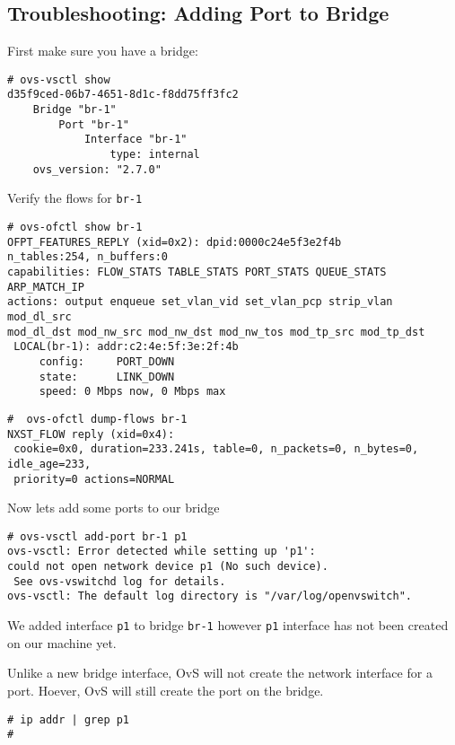 \documentclass[letter]{article}
\begin{document}
{{\begin{appendices}
{\subsection{Troubleshooting: Adding Port to Bridge}

First make sure you have a bridge:
\begin{lstlisting}
# ovs-vsctl show
d35f9ced-06b7-4651-8d1c-f8dd75ff3fc2
    Bridge "br-1"
        Port "br-1"
            Interface "br-1"
                type: internal
    ovs_version: "2.7.0"
\end{lstlisting}

Verify the flows for \texttt{br-1}
\begin{lstlisting}
# ovs-ofctl show br-1
OFPT_FEATURES_REPLY (xid=0x2): dpid:0000c24e5f3e2f4b
n_tables:254, n_buffers:0
capabilities: FLOW_STATS TABLE_STATS PORT_STATS QUEUE_STATS ARP_MATCH_IP
actions: output enqueue set_vlan_vid set_vlan_pcp strip_vlan mod_dl_src 
mod_dl_dst mod_nw_src mod_nw_dst mod_nw_tos mod_tp_src mod_tp_dst
 LOCAL(br-1): addr:c2:4e:5f:3e:2f:4b
     config:     PORT_DOWN
     state:      LINK_DOWN
     speed: 0 Mbps now, 0 Mbps max

\end{lstlisting}

\begin{lstlisting}
#  ovs-ofctl dump-flows br-1
NXST_FLOW reply (xid=0x4):
 cookie=0x0, duration=233.241s, table=0, n_packets=0, n_bytes=0, idle_age=233, 
 priority=0 actions=NORMAL

\end{lstlisting}

Now lets add some ports to our bridge

\begin{lstlisting}
# ovs-vsctl add-port br-1 p1
ovs-vsctl: Error detected while setting up 'p1': 
could not open network device p1 (No such device). 
 See ovs-vswitchd log for details.
ovs-vsctl: The default log directory is "/var/log/openvswitch".
\end{lstlisting}

We added interface \texttt{p1} to bridge \texttt{br-1} however \texttt{p1} interface has not been created on our machine yet.

Unlike a new bridge interface, OvS will not create the network interface for a port. Hoever, OvS will still create the port on the bridge.
\begin{lstlisting}
# ip addr | grep p1
#
\end{lstlisting}

}
\end{appendices}}}
\end{document}
